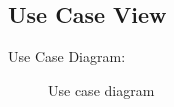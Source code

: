 \documentclass[a4paper,14pt,onecolumn]{report}
\begin{document}
	\subsection{Use Case View}
	Use Case Diagram:
	\begin{center}
		\begin{figure}[!htbp]
			\centering
			\caption{Use case diagram}
			\label{fig:usecase}
		\end{figure}
	\end{center}  
	
\end{document}
